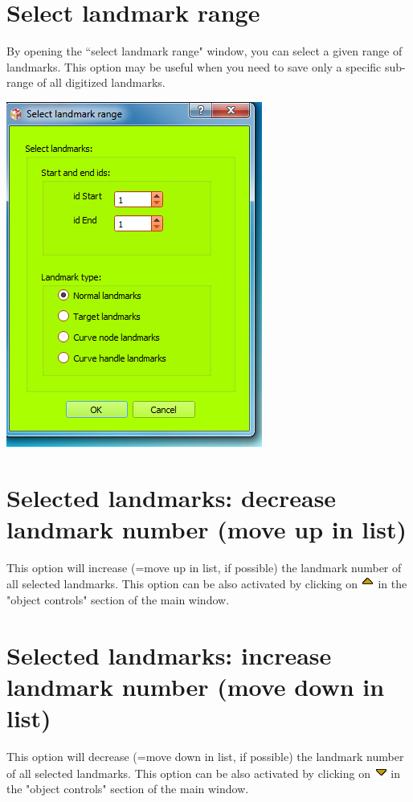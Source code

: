 \section{Select landmark range}
\noindent
\begin{minipage}{0.5\textwidth}
By opening the ``select landmark range" window, you can
select a given range of landmarks. This option may be useful
when you need to save only a specific sub-range of all digitized landmarks.
\end{minipage}    
\begin{minipage}{0.5\textwidth}\centering
  \includegraphics[scale=0.5]{images/10/select_landmark_range.png}
 \end{minipage} 
\noindent


\section{Selected landmarks: decrease landmark number (move up in list)}
This option will increase (=move up in list, if possible) the landmark number of all selected landmarks. This option can be also activated by clicking on \includegraphics[scale=0.7]{images/06/objects/move_up.png} in the "object controls" section of the main window.
 
\section{Selected landmarks: increase landmark number (move down in list)}
 This option will decrease (=move down in list, if possible) the landmark number of all selected landmarks.
This option can be also activated by clicking on \includegraphics[scale=0.7]{images/06/objects/move_down.png} in the "object controls" section of the main window.

